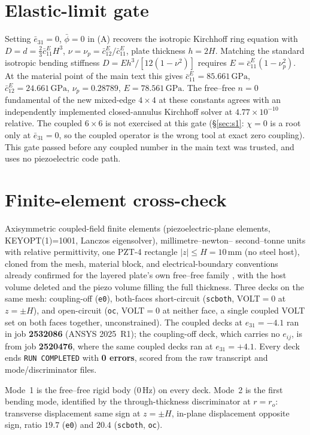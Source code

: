\documentclass[11pt]{article}
\newcommand{\eebar}{\bar{e}_{31}}
\newcommand{\cbar}{\bar{c}_{11}^{E}}
\begin{document}
\section{Elastic-limit gate}
\label{sec:s2}
Setting $\eebar=0$, $\bar\phi=0$ in (A) recovers the isotropic Kirchhoff
ring equation with $D=d=\tfrac23\cbar H^3$,
$\nu=\nu_p=\bar c_{12}^E/\cbar$, plate thickness $h=2H$. Matching the
standard isotropic bending stiffness $D=Eh^3/[12(1-\nu^2)]$ requires
$E=\cbar(1-\nu_p^2)$. At the material point of the main text this gives
$\cbar=85.661\,\mathrm{GPa}$, $\bar c_{12}^E=24.661\,\mathrm{GPa}$,
$\nu_p=0.28789$, $E=78.561\,\mathrm{GPa}$. The free--free $n=0$
fundamental of the new mixed-edge $4\times4$ at these constants agrees
with an independently implemented closed-annulus Kirchhoff solver
\cite{mccune2026ring} at $4.77\times10^{-10}$ relative. The coupled
$6\times6$ is not exercised at this gate (\S\ref{sec:s1}: $\chi=0$ is a
root only at $\eebar=0$, so the coupled operator is the wrong tool at
exact zero coupling). This gate passed before any coupled number in the
main text was trusted, and uses no piezoelectric code path.

\section{Finite-element cross-check}
\label{sec:s3}
Axisymmetric coupled-field finite elements (piezoelectric-plane
elements, KEYOPT(1)=1001, Lanczos eigensolver), millimetre--newton--
second--tonne units with relative permittivity, one PZT-4 rectangle
$\lvert z\rvert\le H=10\,\mathrm{mm}$ (no steel host), cloned from the
mesh, material block, and electrical-boundary conventions already
confirmed for the layered plate's own free--free family
\cite{mccune2026piezo}, with the host volume deleted and the piezo
volume filling the full thickness. Three decks on the same mesh:
coupling-off (\texttt{e0}), both-faces short-circuit (\texttt{scboth},
VOLT$=0$ at $z=\pm H$), and open-circuit (\texttt{oc}, VOLT$=0$ at
neither face, a single coupled VOLT set on both faces together,
unconstrained). The coupled decks at $e_{31}=-4.1$ ran in job
\textbf{2532086} (ANSYS 2025~R1); the coupling-off deck, which carries no
$e_{ij}$, is from job \textbf{2520476}, where the same coupled decks ran
at $e_{31}=+4.1$. Every deck ends \texttt{RUN COMPLETED} with
\textbf{0 errors}, scored from the raw transcript and mode/discriminator
files.

Mode~1 is the free--free rigid body ($0\,\mathrm{Hz}$) on every deck.
Mode~2 is the first bending mode, identified by the through-thickness
discriminator at $r=r_o$: transverse displacement same sign at
$z=\pm H$, in-plane displacement opposite sign, ratio $19.7$
(\texttt{e0}) and $20.4$ (\texttt{scboth}, \texttt{oc}).
\end{document}
